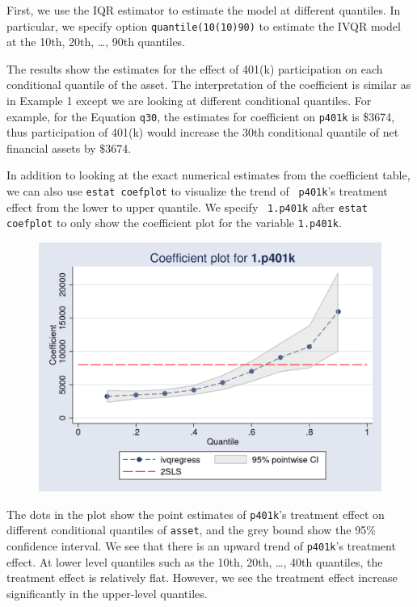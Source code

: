 First, we use the IQR estimator to estimate the model at different quantiles.
In particular, we specify option {\tt quantile(10(10)90)} to estimate the IVQR
model at the 10th, 20th, \ldots, 90th quantiles. 

\begin{stlog}

\end{stlog}

The results show the estimates for the effect of 401(k) participation on each
conditional quantile of the asset. The interpretation of the coefficient is
similar as in Example 1 except we are looking at different conditional
quantiles. For example, for the Equation {\tt q30}, the estimates for
coefficient on {\tt p401k} is \$3674, thus participation of 401(k) would
increase the 30th conditional quantile of net financial assets by \$3674. 

In addition to looking at the exact numerical estimates from the coefficient
table, we can also use {\tt estat coefplot} to visualize the trend of {\tt
p401k}'s treatment effect from the lower to upper quantile. We specify {\tt
1.p401k} after {\tt estat coefplot} to only show the coefficient plot for the
variable {\tt 1.p401k}.

\begin{stlog}

\end{stlog}

\begin{figure}[H]
\centering
\includegraphics[scale=0.25]{eps/ex3_coefplot1}
\end{figure}

The dots in the plot show the point estimates of {\tt p401k}'s treatment effect
on different conditional quantiles of {\tt asset}, and the grey bound show the
95\% confidence interval.  We see that there is an upward trend of {\tt p401k}'s
treatment effect. At lower level quantiles such as the 10th, 20th, \ldots, 40th
quantiles, the treatment effect is relatively flat.  However, we see the
treatment effect increase significantly in the upper-level quantiles. 

